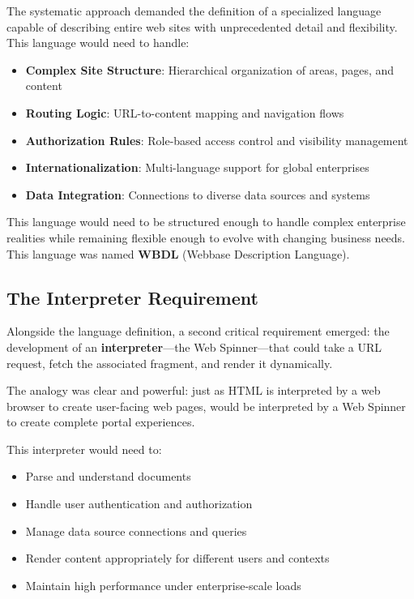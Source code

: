 The systematic approach demanded the definition of a specialized language capable of describing entire web sites with unprecedented detail and flexibility. This language would need to handle:

\begin{itemize}
\item \textbf{Complex Site Structure}: Hierarchical organization of areas, pages, and content
\item \textbf{Routing Logic}: URL-to-content mapping and navigation flows
\item \textbf{Authorization Rules}: Role-based access control and visibility management
\item \textbf{Internationalization}: Multi-language support for global enterprises
\item \textbf{Data Integration}: Connections to diverse data sources and systems
\end{itemize}

This language would need to be structured enough to handle complex enterprise realities while remaining flexible enough to evolve with changing business needs. This language was named \textbf{WBDL} (Webbase Description Language).

\subsection{The Interpreter Requirement}

Alongside the language definition, a second critical requirement emerged: the development of an \textbf{interpreter}—the Web Spinner—that could take a URL request, fetch the associated \wbdl{} fragment, and render it dynamically.

The analogy was clear and powerful: just as HTML is interpreted by a web browser to create user-facing web pages, \wbdl{} would be interpreted by a Web Spinner to create complete portal experiences.

This interpreter would need to:
\begin{itemize}
\item Parse and understand \wbdl{} documents
\item Handle user authentication and authorization
\item Manage data source connections and queries
\item Render content appropriately for different users and contexts
\item Maintain high performance under enterprise-scale loads
\end{itemize}


